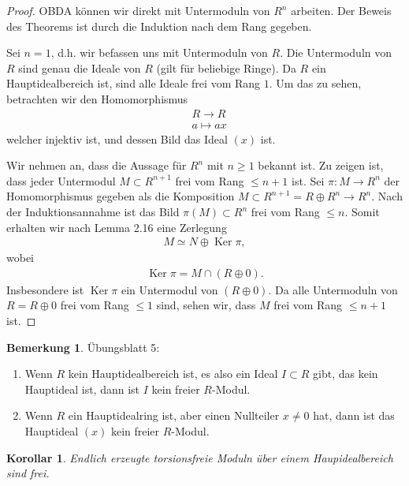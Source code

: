 \documentclass[reqno,12pt]{article}
\numberwithin{equation}{section}
\newcommand{\iso}{\simeq}
\newcommand{\Ker}{\text{Ker }}
\theoremstyle{plain}
\newtheorem{cor}[thm]{Korollar}
\theoremstyle{definition}
\newtheorem{remark}[thm]{Bemerkung}
\renewcommand{\Ker}{\operatorname{Ker}}
\begin{document}
\begin{proof}
OBDA können wir direkt mit Untermoduln von $R^n$ arbeiten. Der Beweis des Theorems ist durch die Induktion nach dem Rang gegeben.

\smallskip

 Sei $n=1$, d.h. wir befassen uns mit Untermoduln von $R$. Die Untermoduln von $R$ sind genau die Ideale von $R$ (gilt für beliebige Ringe). Da $R$ ein Hauptidealbereich ist, sind alle Ideale frei vom Rang $1$. Um das zu sehen, betrachten wir den Homomorphismus
\begin{align*}
& R \to R \\
& a \mapsto ax
\end{align*}
welcher injektiv ist, und dessen Bild das Ideal $(x)$ ist.

\smallskip
{} Wir nehmen an, dass die Aussage für $R^n$ mit $n \geq 1$ bekannt ist. Zu zeigen ist, dass jeder Untermodul $M \subset R^{n+1}$ frei vom Rang $\leq n+1$ ist. Sei $\pi \colon M \to R^n$ der Homomorphismus gegeben als die Komposition $M \subset R^{n+1} = R \oplus R^n \to R^n$. Nach der Induktionsannahme ist das Bild $\pi (M) \subset R^n$ frei vom Rang $\leq n$. Somit erhalten wir nach Lemma 2.16 eine Zerlegung
\begin{align*}
M  \iso N \oplus \Ker \pi,
\end{align*}
wobei
\begin{align*}
\Ker \pi = M \cap (R \oplus 0).
\end{align*}
Insbesondere ist $\Ker \pi$ ein Untermodul von $(R \oplus 0)$. Da alle Untermoduln von $R = R \oplus 0$ frei vom Rang $\leq 1$ sind, sehen wir, dass $M$ frei vom Rang $\leq n+1$ ist.
\end{proof}

\begin{remark}
Übungsblatt 5:
\begin{enumerate}
  \item Wenn $R$ kein Hauptidealbereich ist, es also ein Ideal $I \subset R$ gibt, das kein Hauptideal ist, dann ist $I$ kein freier $R$-Modul.
  \item Wenn $R$ ein Hauptidealring ist, aber einen Nullteiler $x \neq 0$ hat, dann ist das Hauptideal $(x)$ kein freier $R$-Modul.
\end{enumerate}
\end{remark}

\begin{cor}
Endlich erzeugte torsionsfreie Moduln über einem Haupidealbereich sind frei.
\end{cor}
\end{document}

